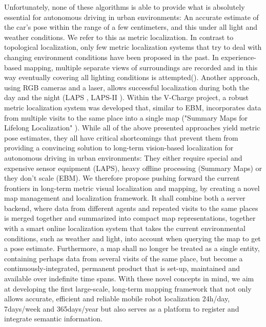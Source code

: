 Unfortunately, none of these algorithms is able to provide what is absolutely essential for autonomous driving in urban environments: An accurate estimate of the car's pose within the range of a few centimeters, and this under all light and weather conditions. We refer to this as metric localization. In contrast to topological localization, only few metric localization systems that try to deal with changing environment conditions have been proposed in the past. In experience-based mapping, multiple separate views of surroundings are recorded and in this way eventually covering all lighting conditions is attempted(\cite{churchill2012practice}). Another approach, using RGB cameras and a laser, allows successful localization during both the day and the night (LAPS \cite{stewart2012laps}, LAPS-II \cite{maddern2014laps}). Within the V-Charge project, a robust metric localization system was developed that, similar to EBM, incorporates data from multiple visits to the same place into a single map ("Summary Maps for Lifelong Localization" \cite{muhlfellner2015summary}).
While all of the above presented approaches yield metric pose estimates, they all have critical shortcomings that prevent them from providing a convincing solution to long-term vision-based localization for autonomous driving in urban environments: They either require special and expensive sensor equipment (LAPS), heavy offline processing (Summary Maps) or they don't scale (EBM). We therefore propose pushing forward the current frontiers in long-term metric visual localization and mapping, by creating a novel map management and localization framework. It shall combine both a server backend, where data from different agents and repeated visits to the same places is merged together and summarized into compact map representations, together with a smart online localization system that takes the current environmental conditions, such as weather and light, into account when querying the map to get a pose estimate. Furthermore, a map shall no longer be treated as a single entity, containing perhaps data from several visits of the same place, but become a continuously-integrated, permanent product that is set-up, maintained and available over indefinite time spans. With these novel concepts in mind, we aim at developing the first large-scale, long-term mapping framework that not only allows accurate, efficient and reliable mobile robot localization 24h/day, 7days/week and 365days/year but also serves as a platform to register and integrate semantic information.


